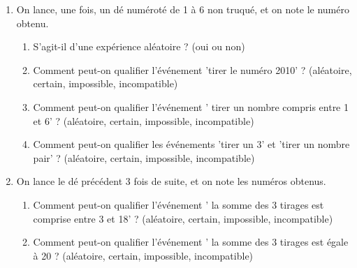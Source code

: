 \begin{minipage}{0.99\linewidth}


\exo

\begin{enumerate}
\item On lance, une fois, un dé numéroté de 1 à 6 non truqué, et on note le numéro obtenu.

\begin{enumerate}
\item S'agit-il d'une expérience aléatoire ? (oui ou non)
\item Comment peut-on qualifier l'événement 'tirer le numéro 2010' ? (aléatoire, certain, impossible, incompatible)
\item Comment peut-on qualifier l'événement ' tirer un nombre compris entre 1 et 6' ? (aléatoire, certain, impossible, incompatible)
\item Comment peut-on qualifier les événements 'tirer un 3' et 'tirer un nombre pair' ? (aléatoire, certain, impossible, incompatible)

\end{enumerate}

\item On lance le dé précédent 3 fois de suite, et on note les numéros obtenus.

\begin{enumerate}
\item Comment peut-on qualifier l'événement ' la somme des 3 tirages est comprise entre 3 et 18' ? (aléatoire, certain, impossible, incompatible)
\item Comment peut-on qualifier l'événement ' la somme des 3 tirages est égale à 20 ? (aléatoire, certain, impossible, incompatible)

\end{enumerate}
\end{enumerate}


\end{minipage}

\vspace{0.5cm}
